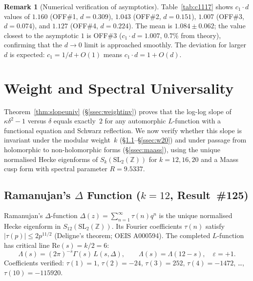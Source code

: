 \documentclass[11pt, a4paper]{article}
\theoremstyle{plain}
\theoremstyle{definition}
\newtheorem{remark}{Remark}[section]
\begin{document}
\begin{remark}[Numerical verification of asymptotics]
  Table~\ref{tab:c1117} shows $c_{1}\cdot d$ values of
  $1.160$ (OFF\#1, $d=0.309$), $1.043$ (OFF\#2, $d=0.151$),
  $1.007$ (OFF\#3, $d=0.074$), and $1.127$ (OFF\#4, $d=0.224$).
  The mean is $1.084\pm 0.062$; the value closest to the asymptotic
  $1$ is OFF\#3 ($c_{1}\cdot d = 1.007$, $0.7\%$ from theory),
  confirming that the $d\to 0$ limit is approached smoothly.
  The deviation for larger $d$ is expected: $c_{1}=1/d+O(1)$ means
  $c_{1}\cdot d = 1 + O(d)$.
\end{remark}


\section{Weight and Spectral Universality}
\label{sec:modular}

Theorem~\ref{thm:slopeuniv} (\S\ref{ssec:weightinv}) proves that the
log-log slope of $\kappa\delta^{2}-1$ versus $\delta$ equals exactly~$2$
for any automorphic $L$-function with a functional equation and Schwarz reflection.
We now verify whether this slope is invariant under the modular weight~$k$
(\S\ref{ssec:delta12}--\S\ref{ssec:w20})
and under passage from holomorphic to non-holomorphic forms
(\S\ref{ssec:maass}), using the unique normalised Hecke eigenforms of
$S_k(\mathrm{SL}_2(\mathbb{Z}))$ for $k=12,16,20$ and a Maass cusp form
with spectral parameter $R=9.5337$.

\subsection{Ramanujan's $\Delta$ Function ($k=12$, Result~\#125)}
\label{ssec:delta12}

Ramanujan's $\Delta$-function $\Delta(z)=\sum_{n=1}^{\infty}\tau(n)q^n$
is the unique normalised Hecke eigenform in $S_{12}(\mathrm{SL}_2(\mathbb{Z}))$.
Its Fourier coefficients $\tau(n)$ satisfy $|\tau(p)|\leq 2p^{11/2}$
(Deligne's theorem; OEIS A000594).  The completed $L$-function has critical
line $\mathrm{Re}(s)=k/2=6$:
\[
  \Lambda(s) = (2\pi)^{-s}\Gamma(s)\,L(s,\Delta), \qquad
  \Lambda(s)=\Lambda(12-s), \quad \varepsilon=+1.
\]
Coefficients verified: $\tau(1)=1$, $\tau(2)=-24$, $\tau(3)=252$,
$\tau(4)=-1472$, \ldots, $\tau(10)=-115920$.
\end{document}
